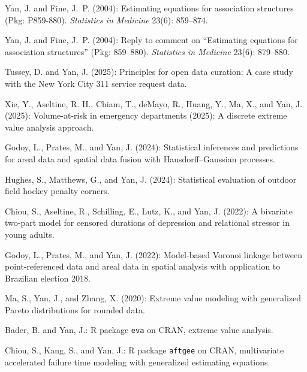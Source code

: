 \documentclass[Statistics]{vita}
\begin{document}
\begin{vita}
\begin{Publications}
\begin{RefereedJournalArticles}
  \item Yan, J. and Fine, J.~P. (2004): Estimating equations for association structures ({P}kg: P859-880). {\em Statistics in Medicine\/} 23(6): 859--874.
  \item Yan, J. and Fine, J.~P. (2004): Reply to comment on ``Estimating equations for association structures'' ({P}kg: 859--880). {\em Statistics in Medicine\/} 23(6): 879--880.
  \end{RefereedJournalArticles}
  \begin{UnderReview}
  \item Tussey, D. and Yan, J. (2025): Principles for open data curation: A case study with the New York City 311 service request data.
  \item *Xie, Y., Aseltine, R.  H., Chiam, T.,  deMayo, R., Huang, Y., Ma, X., and Yan, J. (2025): Volume-at-risk in emergency departments (2025): A discrete extreme value analysis approach.
  \item *Godoy, L., Prates, M., and Yan, J. (2024): Statistical inferences and predictions for areal data and spatial data fusion with Hausdorff--Gaussian processes.
  \item *Hughes, S., Matthews, G., and Yan, J. (2024): Statistical evaluation of outdoor field hockey penalty corners.
  \item Chiou, S., Aseltine, R., Schilling, E., Lutz, K., and Yan, J. (2022): A bivariate two-part model for censored durations of depression and relational stressor in young adults.
  \item *Godoy, L., Prates, M., and Yan, J. (2022): Model-based Voronoi linkage between point-referenced data and areal data in spatial analysis with application to Brazilian election 2018.
  \item *Ma, S., Yan, J., and Zhang, X. (2020): Extreme value modeling with generalized Pareto distributions for rounded data.
  \end{UnderReview}
  \begin{Software}
  \item *Bader, B. and Yan, J.: R package \texttt{eva} on CRAN, extreme value analysis.
  \item *Chiou, S., Kang, S., and Yan, J.: R package \texttt{aftgee} on CRAN, multivariate accelerated failure time modeling with generalized estimating equations.

\end{Software}
\end{Publications}
\end{vita}
\end{document}
